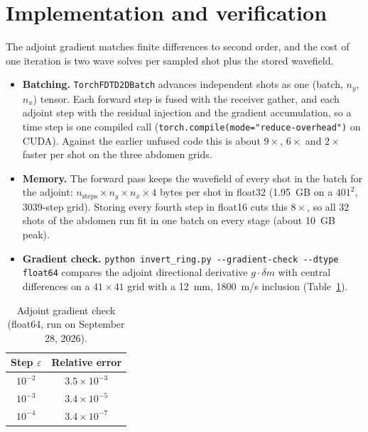 \documentclass[11pt]{article}
\newcommand{\code}[1]{\texttt{#1}}
\begin{document}
\section{Implementation and verification}
\label{sec:verification}

The adjoint gradient matches finite differences to second order, and the cost
of one iteration is two wave solves per sampled shot plus the stored wavefield.

\begin{itemize}
  \item \textbf{Batching.} \code{TorchFDTD2DBatch} advances independent shots
    as one (batch, $n_y$, $n_x$) tensor. Each forward step is fused with the
    receiver gather, and each adjoint step with the residual injection and the
    gradient accumulation, so a time step is one compiled call
    (\code{torch.compile(mode="reduce-overhead")} on CUDA). Against the earlier
    unfused code this is about $9\times$, $6\times$ and $2\times$ faster per
    shot on the three abdomen grids.
  \item \textbf{Memory.} The forward pass keeps the wavefield of every shot in
    the batch for the adjoint: $n_{\mathrm{steps}} \times n_y \times n_x \times 4$
    bytes per shot in float32 (1.95~GB on a $401^2$, 3039-step grid). Storing
    every fourth step in float16 cuts this $8\times$, so all 32 shots of the
    abdomen run fit in one batch on every stage (about 10~GB peak).
  \item \textbf{Gradient check.} \code{python invert\_ring.py -{}-gradient-check
    -{}-dtype float64} compares the adjoint directional derivative
    $g \cdot \delta m$ with central differences on a $41 \times 41$ grid with a
    12~mm, 1800~m/s inclusion (Table~\ref{tab:gradcheck}).
\end{itemize}

\begin{table}[ht]
\centering
\small
\caption{Adjoint gradient check (float64, run on September 28, 2026).}
\label{tab:gradcheck}
\begin{tabular}{@{}cc@{}}
\toprule
Step $\varepsilon$ & Relative error \\
\midrule
$10^{-2}$ & $3.5\times10^{-3}$ \\
$10^{-3}$ & $3.4\times10^{-5}$ \\
$10^{-4}$ & $3.4\times10^{-7}$ \\
\bottomrule
\end{tabular}
\end{table}
\end{document}
